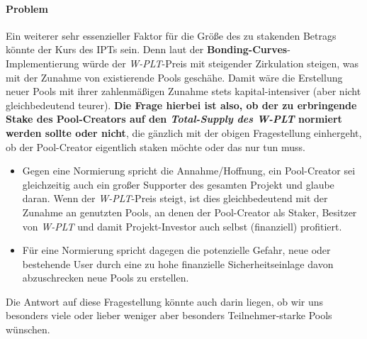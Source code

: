 \paragraph{Problem}
\textbf{ }
\vspace{0.3cm}	

\begin{Problem}
\vspace{0.2cm}


\vspace{0.5cm}


\vspace{0.5cm}

Ein weiterer sehr essenzieller Faktor für die Größe des zu stakenden Betrags könnte der Kurs des IPTs sein. Denn laut der \textbf{Bonding-Curves}-Implementierung würde der \textit{W-PLT}-Preis mit steigender Zirkulation steigen, was mit der Zunahme von existierende Pools geschähe. Damit wäre die Erstellung neuer Pools mit ihrer zahlen\-mäßigen Zunahme stets kapital-intensiver (aber nicht gleichbedeutend teurer). \textbf{Die Frage hierbei ist also, ob der zu erbringende Stake des Pool-Creators auf den \textit{Total-Supply des W-PLT} normiert werden sollte oder nicht}, die gänzlich mit der obigen Fragestellung einhergeht, ob der Pool-Creator eigentlich staken möchte oder das nur tun muss.
	
\begin{itemize}
	\item Gegen eine Normierung spricht die Annahme/Hoffnung, ein Pool-Creator sei gleichzeitig auch ein großer Supporter des gesamten Projekt und glaube daran. Wenn der \textit{W-PLT}-Preis steigt, ist dies gleichbedeutend mit der Zunahme an genutzten Pools, an denen der Pool-Creator als Staker, Besitzer von \textit{W-PLT} und damit Projekt-Investor auch selbst (finanziell) profitiert.
	\item Für eine Normierung spricht dagegen die potenzielle Gefahr, neue oder bestehende User durch eine zu hohe finanzielle Sicherheitseinlage davon abzuschrecken neue Pools zu erstellen.
\end{itemize}

\vspace{0.2cm}
	
Die Antwort auf diese Fragestellung könnte auch darin liegen, ob wir uns besonders viele oder lieber weniger aber besonders Teilnehmer-starke Pools wünschen.


\end{Problem}
